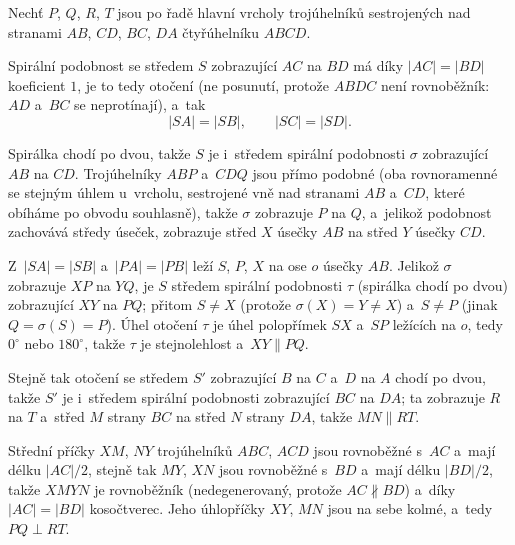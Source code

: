 {
    Nechť $P$, $Q$, $R$, $T$ jsou po řadě hlavní vrcholy trojúhelníků sestrojených nad stranami $AB$, $CD$, $BC$, $DA$ čtyřúhelníku $ABCD$.

    Spirální podobnost se středem $S$ zobrazující $AC$ na $BD$ má díky $|AC| = |BD|$ koeficient $1$, je to tedy otočení (ne posunutí, protože $ABDC$ není rovnoběžník: $AD$ a~$BC$ se neprotínají), a~tak
    $$
    |SA| = |SB|, \qquad |SC| = |SD|.
    $$

    Spirálka chodí po dvou, takže $S$ je i~středem spirální podobnosti $\sigma$ zobrazující $AB$ na $CD$. Trojúhelníky $ABP$ a~$CDQ$ jsou přímo podobné (oba rovnoramenné se stejným úhlem u~vrcholu, sestrojené vně nad stranami $AB$ a~$CD$, které obíháme po obvodu souhlasně), takže $\sigma$ zobrazuje $P$ na $Q$, a~jelikož podobnost zachovává středy úseček, zobrazuje střed $X$ úsečky $AB$ na střed $Y$ úsečky $CD$.


    Z~$|SA| = |SB|$ a~$|PA| = |PB|$ leží $S$, $P$, $X$ na ose $o$ úsečky $AB$. Jelikož $\sigma$ zobrazuje $XP$ na $YQ$, je $S$ středem spirální podobnosti $\tau$ (spirálka chodí po dvou) zobrazující $XY$ na $PQ$; přitom $S \neq X$ (protože $\sigma(X) = Y \neq X$) a~$S \neq P$ (jinak $Q = \sigma(S) = P$). Úhel otočení $\tau$ je úhel polopřímek $SX$ a~$SP$ ležících na $o$, tedy $0^\circ$ nebo $180^\circ$, takže $\tau$ je stejnolehlost a~$XY \parallel PQ$.

    Stejně tak otočení se středem $S'$ zobrazující $B$ na $C$ a~$D$ na $A$ chodí po dvou, takže $S'$ je i~středem spirální podobnosti zobrazující $BC$ na $DA$; ta zobrazuje $R$ na $T$ a~střed $M$ strany $BC$ na střed $N$ strany $DA$, takže $MN \parallel RT$.


    Střední příčky $XM$, $NY$ trojúhelníků $ABC$, $ACD$ jsou rovnoběžné s~$AC$ a~mají délku $|AC|/2$, stejně tak $MY$, $XN$ jsou rovnoběžné s~$BD$ a~mají délku $|BD|/2$, takže $XMYN$ je rovnoběžník (nedegenerovaný, protože $AC \nparallel BD$) a~díky $|AC| = |BD|$ kosočtverec. Jeho úhlopříčky $XY$, $MN$ jsou na sebe kolmé, a~tedy $PQ \perp RT$.
}


